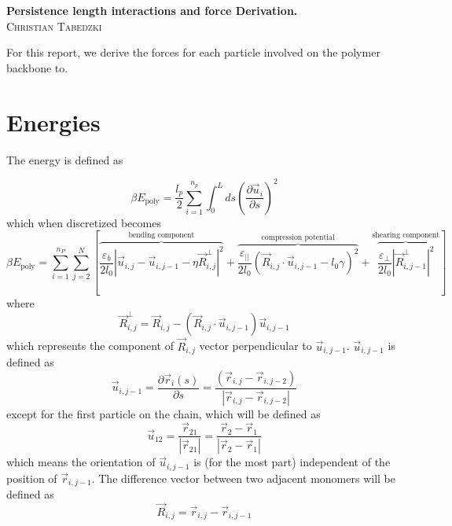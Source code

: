 \documentclass{article}
\renewcommand{\ij}{_{i,j}}
\newcommand{\ijj}{_{i,j-1}}
\newcommand{\ijk}{_{i,j-2}}
\newcommand{\magn}[1]{\left\vert #1 \right\vert }
\renewcommand{\part}[2]{\frac{\partial #1 }{\partial #2}}
\begin{document}
\begin{center}
  \textbf{Persistence length interactions and force Derivation.}\\
  \textsc{Christian Tabedzki}
\end{center} 


For this report, we derive the forces for each particle involved on the polymer backbone to.

\section{Energies}

The energy is defined as 

\begin{equation}
  \label{eqn:Energy_polymer}
  \beta E_{\text{poly}}  =  \frac{l_p}{2} \sum_{i=1}^{n_p} \int_0^L ds \left(\part{\vec{u}_i}{s}\right)^2
\end{equation}
which when discretized becomes
\begin{equation}
  \label{eqn:Energy_polymer_discrete}
  \beta E_{\text{poly}}  =  \sum_{i=1}^{n_P}  \sum_{j=2}^{N} \left[
  \overbrace{
  \frac{\varepsilon_b}{2 l_0}  \magn{ \vec{u} \ij - \vec{u} \ijj - \eta 
  \vec{R}\ij ^\bot} ^2 
  }^{\text{bending component}}
  +
\overbrace{
  \frac{\varepsilon_{\vert \vert}}{2 l_0} 
  \left( \vec{R}\ij \cdot \vec{u} \ijj - l_0 \gamma \right)^2 
  }^{\text{compression potential}}
  +
  \overbrace{
  \frac{\varepsilon _\perp}
  {2l_0} \magn{\vec{R}\ijj ^\perp}^2
  }^{\text{shearing component}}
  \right]
\end{equation}
where 
\[
\vec{R}\ij  ^\bot = \vec{R} \ij - \left(\vec{R} \ij \cdot \vec{u} \ijj \right)
\vec{u} \ijj 
\]
which represents the component of \(\vec{R} \ij\) vector perpendicular to \(\vec{u} \ijj \).
\(\vec{u} \ijj \) is defined as  
  \[
  \vec{u}_{i,j-1} = 
  \part{\vec{{}r}_i(s)}{s} = 
    \frac{\left( \vec{r}\ij-\vec{r}\ijk \right)}{\magn{\vec{r}\ij - \vec{r}\ijk}} \]
except for the first particle on the chain, which will be defined as 
\[
  \vec{u}_{12} = \frac{\vec{r}_{21}}{\magn{\vec{r}_{21}}} = 
  \frac{\vec{r}_2 - \vec{r}_1}{\magn{\vec{r}_2 - \vec{r}_1}}
\]
which means the orientation of \(\vec{u}_{i,j-1}\) is (for the most part)
independent of the position of \(\vec{r}\ijj\). The difference vector between
two adjacent monomers will be defined as  
\[\vec{R} \ij = \vec{r} \ij - \vec{r} \ijj \]
\end{document}

